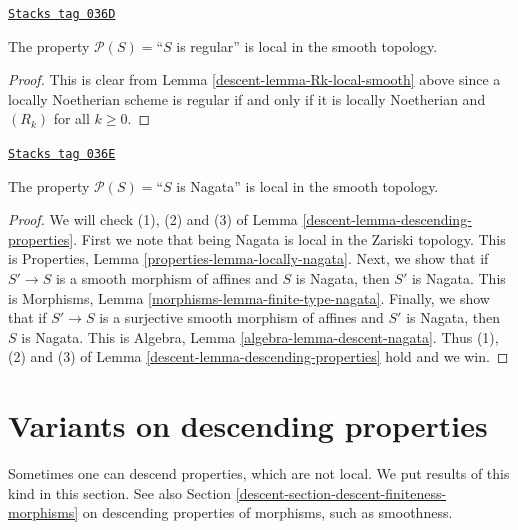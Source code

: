 \begin{lemma}
\label{descent-lemma-regular-local-smooth}
\href{https://stacks.math.columbia.edu/tag/036D}{\texttt{Stacks tag 036D}}

The property $\mathcal{P}(S) =$``$S$ is regular''
is local in the smooth topology.
\end{lemma}

\begin{proof}

This is clear from Lemma \ref{descent-lemma-Rk-local-smooth}
above since a locally Noetherian scheme is regular if and only if
it is locally Noetherian and $(R_k)$ for all $k \geq 0$.
\end{proof}

\begin{lemma}
\label{descent-lemma-Nagata-local-smooth}
\href{https://stacks.math.columbia.edu/tag/036E}{\texttt{Stacks tag 036E}}

The property $\mathcal{P}(S) =$``$S$ is Nagata''
is local in the smooth topology.
\end{lemma}

\begin{proof}

We will check (1), (2) and (3) of Lemma \ref{descent-lemma-descending-properties}.
First we note that being Nagata is local in the Zariski topology.
This is Properties, Lemma \ref{properties-lemma-locally-nagata}.
Next, we show that if $S' \to S$ is a smooth morphism of affines
and $S$ is Nagata, then $S'$ is Nagata. This
is Morphisms, Lemma \ref{morphisms-lemma-finite-type-nagata}.
Finally, we show that if $S' \to S$ is a surjective
smooth morphism of affines and $S'$ is Nagata,
then $S$ is Nagata. This is
Algebra, Lemma \ref{algebra-lemma-descent-nagata}.
Thus (1), (2) and (3) of Lemma \ref{descent-lemma-descending-properties} hold
and we win.
\end{proof}

\section{Variants on descending properties}
\label{descent-section-variants}
Sometimes one can descend properties, which are not local.
We put results of this kind in this section. See also
Section \ref{descent-section-descent-finiteness-morphisms}
on descending properties of morphisms,
such as smoothness.

